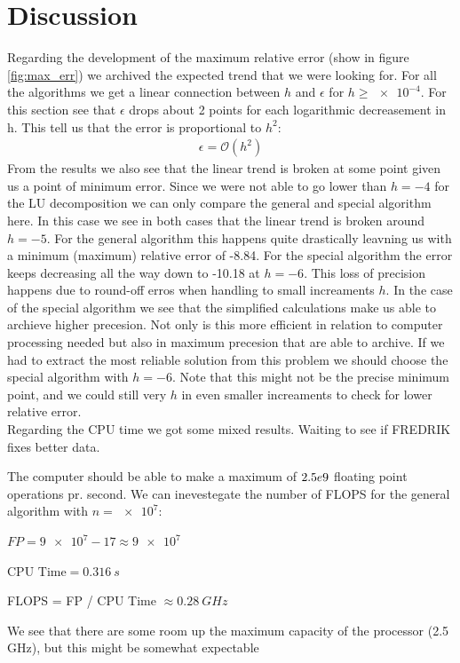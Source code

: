 \documentclass[american,a4paper,12pt]{article}
\begin{document}
\section{Discussion}
Regarding the development of the maximum relative error (show in figure \ref{fig:max_err}) we archived the expected trend that we were looking for. For all the algorithms we get a linear connection between $h$ and $\epsilon$ for $h \ge \num{e-4}$. For this section see that $\epsilon$ drops about 2 points for each logarithmic decreasement in h. This tell us that the error is proportional to $h^2$:
\begin{align*}
  \epsilon = \mathcal{O}(h^2)
\end{align*}
From the results we also see that the linear trend is broken at some point given us a point of minimum error. Since we were not able to go lower than $h = \num{-4}$ for the LU decomposition we can only compare the general and special algorithm here. In this case we see in both cases that the linear trend is broken around $h = \num{-5}$. For the general algorithm this happens quite drastically leavning us with a minimum (maximum) relative error of -8.84. For the special algorithm the error keeps decreasing all the way down to -10.18 at $h = \num{-6}$. This loss of precision happens due to round-off erros when handling to small increaments $h$. In the case of the special algorithm we see that the simplified calculations make us able to archieve higher precesion. Not only is this more efficient in relation to computer processing needed but also in maximum precesion that are able to archive. If we had to extract the most reliable solution from this problem we should choose the special algorithm with $h = \num{-6}$. Note that this might not be the precise minimum point, and we could still very $h$ in even smaller increaments to check for lower relative error. \\
Regarding the CPU time we got some mixed results. Waiting to see if FREDRIK fixes better data. 




The computer should be able to make a maximum of $\num2.5e9$ floating point operations pr. second. We can inevestegate the number of FLOPS for the general algorithm with $n = \num{e7}$:
\begin{center}
  $FP = \num{9e7} - 17 \approx \num{9e7}$
\end{center}
\begin{center}
  $\text{CPU Time} = 0.316 \ s$
\end{center}
\begin{center}
  FLOPS = FP / CPU Time $\approx 0.28 \ GHz$
\end{center}
We see that there are some room up the maximum capacity of the processor (2.5 GHz), but this might be somewhat expectable
\end{document}
